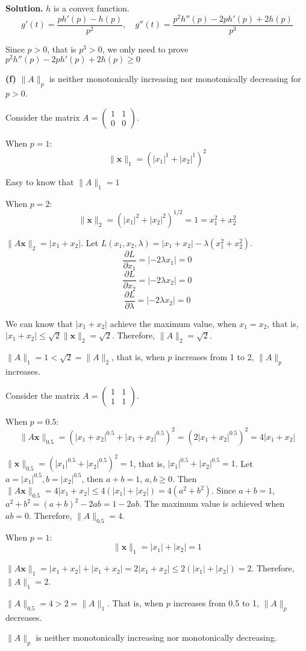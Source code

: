 \documentclass[12pt, a4paper, oneside]{ctexart}
\newenvironment{solution}{\par\noindent\textbf{Solution. }}{\par}
\begin{document}
\begin{solution}
$h$ is a convex function.
$$
g'(t)=\frac{ph'(p)-h(p)}{p^2}, \quad g''(t)=\frac{p^2 h''(p)-2ph'(p)+2h(p)}{p^3}
$$

Since $p>0$, that is $p^3>0$, we only need to prove $p^2 h''(p)-2ph'(p)+2h(p) \geq 0$

\vspace{12pt}

\textbf{(f)}
$\|A\|_p$ is neither monotonically increasing nor monotonically decreasing for $p>0$.

Consider the matrix $ A=\begin{pmatrix}1&1\\0&0\end{pmatrix} $.

When $ p = 1 $:
$$
\|\mathbf{x}\|_{1}=\left(|x_1|^{1}+|x_2|^{1}\right)^2
$$

Easy to know that $ \|A\|_{1}=1$

When $ p = 2 $:
$$
\|\mathbf{x}\|_2=\left(|x_1|^2+|x_2|^2\right)^{1/2}=1=x_1^2+x_2^2
$$

$ \|A\mathbf{x}\|_2 = |x_1 + x_2| $. Let $L(x_1,x_2,\lambda)=|x_1+x_2|-\lambda(x_1^2+x_2^2)$.
$$
\frac{\partial L}{\partial x_1}=|-2\lambda x_1|=0
$$
$$
\frac{\partial L}{\partial x_2}=|-2\lambda x_2|=0
$$
$$
\frac{\partial L}{\partial \lambda}=|-2\lambda x_2|=0
$$

We can know that $|x_1 + x_2|$ achieve the maximum value, when $x_1=x_2$, that is,
$ |x_1 + x_2|\leq\sqrt{2}\|\mathbf{x}\|_2=\sqrt{2} $. Therefore, $ \|A\|_2=\sqrt{2}$.

$ \|A\|_{1}=1<\sqrt{2}=\|A\|_2 $, that is, when $ p $ increases from 1 to 2, $ \|A\|_p $ increases.

Consider the matrix $ A=\begin{pmatrix}1&1\\1&1\end{pmatrix} $.

When $ p = 0.5 $:
$$
\|A\mathbf{x}\|_{0.5}=\left(|x_1 + x_2|^{0.5}+|x_1 + x_2|^{0.5}\right)^2=(2|x_1 + x_2|^{0.5})^2 = 4|x_1 + x_2|
$$

$ \|\mathbf{x}\|_{0.5}=\left(|x_1|^{0.5}+|x_2|^{0.5}\right)^2 = 1 $, that is, $ |x_1|^{0.5}+|x_2|^{0.5}=1 $. Let $ a = |x_1|^{0.5}, b = |x_2|^{0.5} $, then $ a + b = 1 $, $ a,b\geq0 $. Then $ \|A\mathbf{x}\|_{0.5}=4|x_1 + x_2|\leq4(|x_1|+|x_2|)=4(a^2 + b^2) $. Since $ a + b = 1 $, $a^2 + b^2=(a + b)^2-2ab = 1 - 2ab $. The maximum value is achieved when $ ab = 0 $. Therefore, $ \|A\|_{0.5}=4 $.

When $ p = 1 $:
$$
\|\mathbf{x}\|_1=|x_1|+|x_2| = 1
$$

$ \|A\mathbf{x}\|_1=|x_1 + x_2|+|x_1 + x_2| = 2|x_1 + x_2|\leq2(|x_1|+|x_2|)=2 $. Therefore, $ \|A\|_1 = 2 $.

$ \|A\|_{0.5}=4>2=\|A\|_1$. That is, when $ p $ increases from 0.5 to 1, $ \|A\|_p $ decreases.

$\|A\|_p$ is neither monotonically increasing nor monotonically decreasing.

\end{solution}
\end{document}

